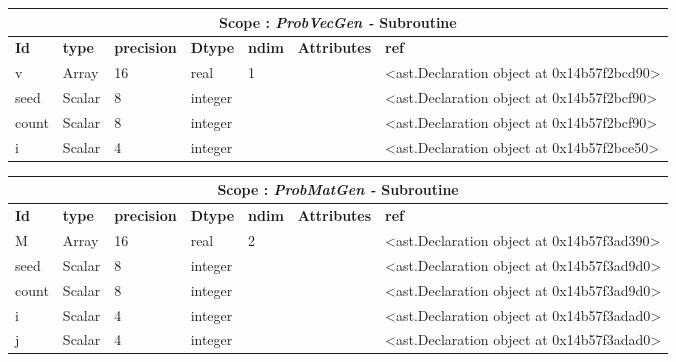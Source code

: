 \documentclass{report}
\begin{document}
 \vspace{1cm}

\begin{center}
\begin{longtable}{|p{3.5cm}|p{1.5cm}|p{1.5cm}|p{1.5cm}|p{1cm}|p{2cm}|p{4cm}| }
\hline
\multicolumn{7}{|c|}{\textbf{Scope : \qquad}  \textbf{\textit{ProbVecGen - }Subroutine}}\\ 
\hline
\textbf{Id} & \textbf{type} & \textbf{precision} & \textbf{Dtype} & \textbf{ndim} & \textbf{Attributes} & \textbf{ref} \\\hline

v & Array & 16 & real & 1 &  & <ast.Declaration object at 0x14b57f2bcd90> \\\hline

seed & Scalar & 8 & integer &  &  & <ast.Declaration object at 0x14b57f2bcf90> \\\hline

count & Scalar & 8 & integer &  &  & <ast.Declaration object at 0x14b57f2bcf90> \\\hline

i & Scalar & 4 & integer &  &  & <ast.Declaration object at 0x14b57f2bce50> \\\hline

\end{longtable}
\end{center}

 \vspace{1cm}

\begin{center}
\begin{longtable}{|p{3.5cm}|p{1.5cm}|p{1.5cm}|p{1.5cm}|p{1cm}|p{2cm}|p{4cm}| }
\hline
\multicolumn{7}{|c|}{\textbf{Scope : \qquad}  \textbf{\textit{ProbMatGen - }Subroutine}}\\ 
\hline
\textbf{Id} & \textbf{type} & \textbf{precision} & \textbf{Dtype} & \textbf{ndim} & \textbf{Attributes} & \textbf{ref} \\\hline

M & Array & 16 & real & 2 &  & <ast.Declaration object at 0x14b57f3ad390> \\\hline

seed & Scalar & 8 & integer &  &  & <ast.Declaration object at 0x14b57f3ad9d0> \\\hline

count & Scalar & 8 & integer &  &  & <ast.Declaration object at 0x14b57f3ad9d0> \\\hline

i & Scalar & 4 & integer &  &  & <ast.Declaration object at 0x14b57f3adad0> \\\hline

j & Scalar & 4 & integer &  &  & <ast.Declaration object at 0x14b57f3adad0> \\\hline

\end{longtable}
\end{center}
\end{document}
